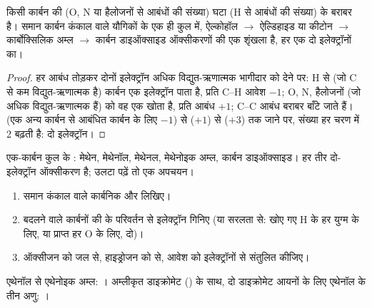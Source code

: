 \begin{proposition}[कार्बन की ऑक्सीकरण संख्याएँ]\label{prop:b1:organic-redox:on-of-carbon}
किसी कार्बन की  (O, N या हैलोजनों से आबंधों की संख्या)
घटा (H से आबंधों की संख्या) के बराबर है। समान कार्बन कंकाल वाले यौगिकों के
एक ही कुल में, ऐल्कोहॉल $\to$ ऐल्डिहाइड या कीटोन $\to$
कार्बोक्सिलिक अम्ल $\to$ कार्बन डाइऑक्साइड ऑक्सीकरणों की एक शृंखला है, हर एक दो
इलेक्ट्रॉनों का।
\end{proposition}

\begin{proof}
हर आबंध तोड़कर दोनों इलेक्ट्रॉन अधिक विद्युत-ऋणात्मक
भागीदार को देने पर: H से (जो C से कम विद्युत-ऋणात्मक है) कार्बन एक इलेक्ट्रॉन पाता है,
प्रति C--H आवेश $-1$; O, N, हैलोजनों (जो अधिक विद्युत-ऋणात्मक हैं) को वह एक
खोता है, प्रति आबंध $+1$; C--C आबंध बराबर बाँटे जाते हैं। 
(एक अन्य कार्बन से आबंधित कार्बन के लिए $-1$) से  ($+1$) से
 ($+3$) तक जाने पर, संख्या हर चरण में 2 बढ़ती है: दो इलेक्ट्रॉन।
\end{proof}

\begin{omfigure}

{\small एक-कार्बन कुल के : मेथेन, मेथेनॉल,
मेथेनल, मेथेनोइक अम्ल, कार्बन डाइऑक्साइड। हर तीर दो-इलेक्ट्रॉन
ऑक्सीकरण है; उलटा पढ़ें तो एक अपचयन।}
\end{omfigure}

\begin{method}\label{met:b1:organic-redox:balance-organic-redox}
\begin{enumerate}
  \item समान कंकाल वाले कार्बनिक  और  लिखिए।
  \item बदलने वाले कार्बनों की  के परिवर्तन से
        इलेक्ट्रॉन गिनिए (या सरलता से: खोए गए H के हर युग्म के लिए, या प्राप्त हर O के लिए,
        दो)।
  \item ऑक्सीजन को जल से, हाइड्रोजन को  से, आवेश को
        इलेक्ट्रॉनों से संतुलित कीजिए।
\end{enumerate}
एथेनॉल से एथेनोइक अम्ल: ।
अम्लीकृत डाइक्रोमेट () के साथ,
दो डाइक्रोमेट आयनों के लिए एथेनॉल के तीन अणु:
।
\end{method}

